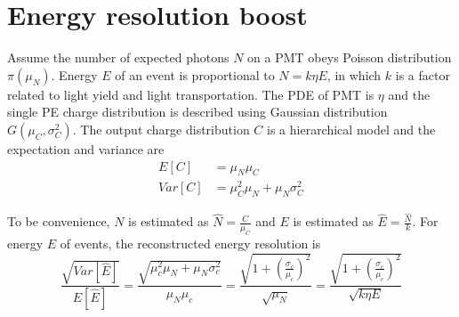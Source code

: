 \section{Energy resolution boost}
\label{Result}
Assume the number of expected photons $N$ on a PMT obeys Poisson distribution $\pi(\mu_N)$. Energy $E$ of an event is proportional to $N=k\eta E$, in which $k$ is a factor related to light yield and light transportation. The PDE of PMT is $\eta$ and the single PE charge distribution is described using Gaussian distribution $G(\mu_C,\sigma_C^2)$. The output charge distribution $C$ is a hierarchical model and the expectation and variance are
\begin{align}
    E[C]&=\mu_N\mu_C\\
    Var[C]&=\mu_C^2\mu_N+\mu_N\sigma_C^2
\end{align}

To be convenience, $N$ is estimated as $\hat{N}=\frac{C}{\mu_C}$ and $E$ is estimated as $\hat{E}=\frac{\hat{N}}{k}$. For  energy $E$ of events, the reconstructed energy resolution is 
\begin{equation}
    \frac{\sqrt{Var[\hat{E}]}}{E[\hat{E}]}=\frac{\sqrt{\mu_c^2\mu_N+\mu_N\sigma_c^2}}{\mu_N\mu_c}=\frac{\sqrt{1+(\frac{\sigma_c}{\mu_c})^2}}{\sqrt{\mu_N}}=\frac{\sqrt{1+(\frac{\sigma_c}{\mu_c})^2}}{\sqrt{k\eta E}}
\end{equation}


